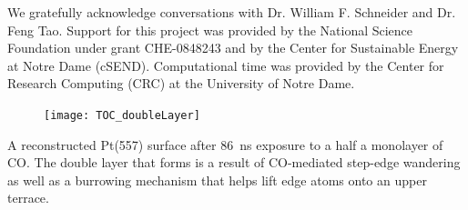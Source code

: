 \documentclass[journal = jpccck, manuscript = article]{achemso}
\begin{document}
\begin{acknowledgement}
  We gratefully acknowledge conversations with Dr. William
  F. Schneider and Dr. Feng Tao.  Support for this project was
  provided by the National Science Foundation under grant CHE-0848243
  and by the Center for Sustainable Energy at Notre Dame
  (cSEND). Computational time was provided by the Center for Research
  Computing (CRC) at the University of Notre Dame.
\end{acknowledgement}
\newpage
{}


\begin{tocentry}
\begin{figure}
\begin{center}
\texttt{[image: TOC\_doubleLayer]}
\end{center}
\end{figure}
A reconstructed Pt(557) surface after 86~ns exposure to a half a
monolayer of CO.  The double layer that forms is a result of
CO-mediated step-edge wandering as well as a burrowing mechanism that
helps lift edge atoms onto an upper terrace.
\end{tocentry}
\end{document}
